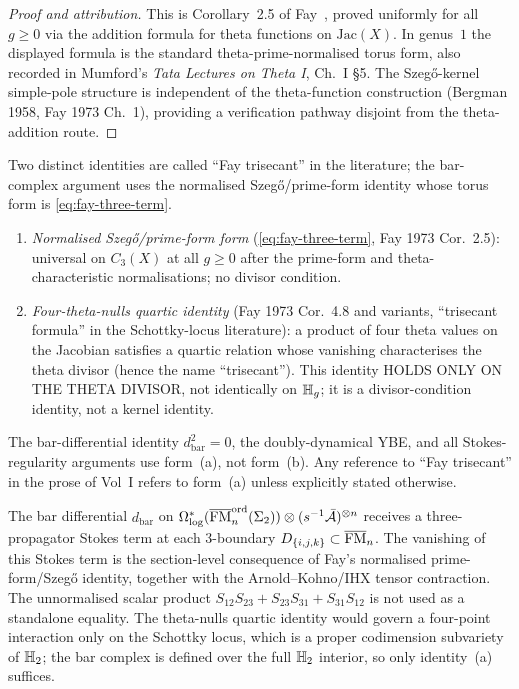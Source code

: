 \begin{proof}[Proof and attribution]
This is Corollary~2.5 of Fay~\cite{Fay73}, proved uniformly
for all $g\ge 0$ via the addition formula for theta
functions on $\mathrm{Jac}(X)$. In genus~$1$ the displayed
formula is the standard theta-prime-normalised torus form, also
recorded in Mumford's \emph{Tata Lectures on Theta I}, Ch.~I
\S5. The Szeg\H{o}-kernel simple-pole structure is independent
of the theta-function construction (Bergman 1958, Fay 1973
Ch.~1), providing a verification pathway disjoint from the
theta-addition route.
\end{proof}

\begin{remark}
\label{rem:fay-name-disambiguation}
Two distinct identities are called ``Fay trisecant'' in the
literature; the bar-complex argument uses the normalised
Szeg\H{o}/prime-form identity whose torus form is
\eqref{eq:fay-three-term}.
\begin{enumerate}[label=\textup{(\alph*)}]
\item \emph{Normalised Szeg\H{o}/prime-form form}
 (\eqref{eq:fay-three-term}, Fay 1973 Cor.~2.5): universal
 on $C_3(X)$ at all $g\ge 0$ after the prime-form and
 theta-characteristic normalisations; no divisor condition.
\item \emph{Four-theta-nulls quartic identity}
 (Fay 1973 Cor.~4.8 and variants, ``trisecant formula'' in
 the Schottky-locus literature): a product of four theta
 values on the Jacobian satisfies a quartic relation
 whose vanishing characterises the theta divisor (hence
 the name ``trisecant''). This identity HOLDS ONLY ON THE
 THETA DIVISOR, not identically on $\mathbb{H}_g$; it is a
 divisor-condition identity, not a kernel identity.
\end{enumerate}
The bar-differential identity $d_{\mathrm{bar}}^2=0$,
the doubly-dynamical YBE, and all Stokes-regularity
arguments use form~(a), not form~(b). Any reference to
``Fay trisecant'' in the prose of Vol~I refers to
form~(a) unless explicitly stated otherwise.
\end{remark}

\begin{remark}
\label{rem:why-a-not-b}
The bar differential $d_{\mathrm{bar}}$ on
$\Omega^*_{\log}(\overline{\mathrm{FM}}_n^{\mathrm{ord}}(\Sigma_2))\otimes
(s^{-1}\bar{\mathcal{A}})^{\otimes n}$ receives a three-propagator
Stokes term at each 3-boundary
$D_{\{i,j,k\}}\subset\overline{\mathrm{FM}}_n$. The vanishing of this Stokes
term is the section-level consequence of Fay's normalised
prime-form/Szeg\H{o} identity, together with the
Arnold--Kohno/IHX tensor contraction. The unnormalised scalar
product $S_{12}S_{23}+S_{23}S_{31}+S_{31}S_{12}$ is not used as
a standalone equality. The theta-nulls quartic identity would
govern a four-point interaction only on the Schottky locus, which
is a proper codimension subvariety of $\mathbb{H}_2$; the bar complex
is defined over the full $\mathbb{H}_2$ interior, so only identity~(a)
suffices.
\end{remark}

